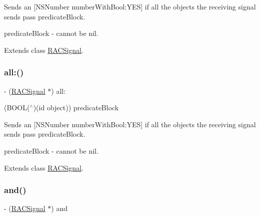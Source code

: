 Sends an \mbox{[}N\+S\+Number number\+With\+Bool\+:Y\+ES\mbox{]} if all the objects the receiving signal sends pass {\ttfamily predicate\+Block}.

predicate\+Block -\/ cannot be nil. 

Extends class \mbox{\hyperlink{interface_r_a_c_signal_adb70e0b813cec0b7bcc5c76f2f3cd88f}{R\+A\+C\+Signal}}.

\mbox{\label{category_r_a_c_signal_07_operations_08_adb70e0b813cec0b7bcc5c76f2f3cd88f}} 
\subsubsection{\texorpdfstring{all\+:()}{all:()}\hspace{0.1cm}{\footnotesize\ttfamily [3/3]}}
{\footnotesize\ttfamily -\/ (\mbox{\hyperlink{interface_r_a_c_signal}{R\+A\+C\+Signal}} $\ast$) all\+: \begin{DoxyParamCaption}\item[{(B\+O\+OL($^\wedge$)(id object))}]{predicate\+Block }\end{DoxyParamCaption}}

Sends an \mbox{[}N\+S\+Number number\+With\+Bool\+:Y\+ES\mbox{]} if all the objects the receiving signal sends pass {\ttfamily predicate\+Block}.

predicate\+Block -\/ cannot be nil. 

Extends class \mbox{\hyperlink{interface_r_a_c_signal_adb70e0b813cec0b7bcc5c76f2f3cd88f}{R\+A\+C\+Signal}}.

\mbox{\label{category_r_a_c_signal_07_operations_08_a4a12f1ef58487260894d1ef37dbb9c9d}} 
\subsubsection{\texorpdfstring{and()}{and()}\hspace{0.1cm}{\footnotesize\ttfamily [1/3]}}
{\footnotesize\ttfamily -\/ (\mbox{\hyperlink{interface_r_a_c_signal}{R\+A\+C\+Signal}} $\ast$) and \begin{DoxyParamCaption}{ }\end{DoxyParamCaption}}


